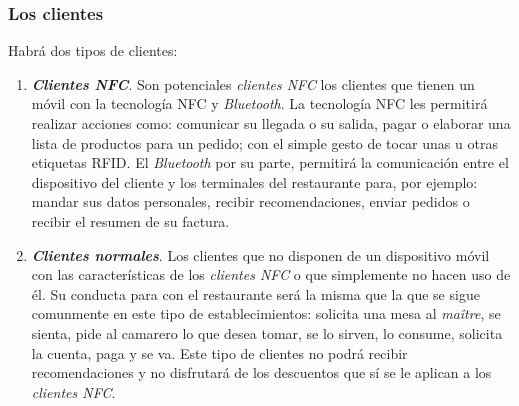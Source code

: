 

    \subsubsection{Los clientes}
    \label{subsubsec:clients}
  Habrá dos tipos de clientes:
  \begin{enumerate}
  \item \emph{\textbf{Clientes \acs{NFC}}}. Son potenciales \emph{clientes
  \acs{NFC}} los clientes que tienen un móvil con la tecnología \acs{NFC} y
  \emph{Bluetooth}. La tecnología \acs{NFC} les permitirá realizar acciones
  como: comunicar su llegada o su salida, pagar o elaborar una lista de
  productos para un pedido; con el simple gesto de tocar unas u otras
  etiquetas \acs{RFID}. El \emph{Bluetooth} por su parte, permitirá la
  comunicación entre el dispositivo del cliente y los terminales del
  restaurante para, por ejemplo: mandar sus datos personales, recibir
  recomendaciones, enviar pedidos o recibir el resumen de su factura.
  \item \emph{\textbf{Clientes normales}}. Los clientes que no disponen
  de un dispositivo móvil con las características de los \emph{clientes
  \acs{NFC}} o que simplemente no hacen uso de él. Su conducta para con
  el restaurante será la misma que la que se sigue comunmente en este tipo
  de establecimientos: solicita una mesa al \emph{maître}, se sienta,
  pide al camarero lo que desea tomar, se lo sirven, lo consume, solicita
  la cuenta, paga y se va. Este tipo de clientes no podrá recibir
  recomendaciones y no disfrutará de los descuentos que sí se le aplican
  a los \emph{clientes \acs{NFC}}.
  \end{enumerate}

